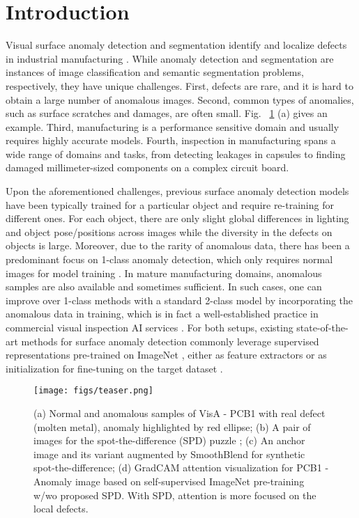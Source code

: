 \documentclass[runningheads]{llncs}
\begin{document}
\section{Introduction}
Visual surface anomaly detection and segmentation identify and localize defects in industrial manufacturing \cite{bergmann2021mvtec}. While anomaly detection and segmentation are instances of image classification and semantic segmentation problems, respectively, they have unique challenges. First, defects are rare, and it is hard to obtain a large number of anomalous images. Second, common types of anomalies, such as surface scratches and damages, are often small. Fig. ~\ref{fig:teaser} (a) gives an example. Third, manufacturing is a performance sensitive domain and usually requires highly accurate models. Fourth, inspection in manufacturing spans a wide range of domains and tasks, from detecting leakages in capsules to finding damaged millimeter-sized components on a complex circuit board. 

Upon the aforementioned challenges, previous surface anomaly detection models have been typically trained for a particular object and require re-training for different ones. For each object, there are only slight global differences in lighting and object pose/positions across images while the diversity in the defects on objects is large. 
Moreover, due to the rarity of anomalous data, there has been a predominant focus on 1-class anomaly detection, which only requires normal images for model training \cite{caron2020unsupervised,cohen2020sub,defard2021padim,li2021cutpaste,Roth_2022_CVPR,yi2020patch}. In mature manufacturing domains, anomalous samples are also available and sometimes sufficient. In such cases, one can improve over 1-class methods with a standard 2-class 
model \cite{cui2019class,feng2021few,gornitz2013toward,lin2017focal} by incorporating the anomalous data in training, which is in fact a well-established practice in commercial visual inspection AI services \cite{LfV,VIAI}.
For both setups, existing state-of-the-art methods for surface anomaly detection commonly leverage supervised representations pre-trained on ImageNet \cite{deng2009imagenet}, 
either as feature extractors \cite{defard2021padim,Roth_2022_CVPR} or as initialization for fine-tuning on the target dataset \cite{li2021cutpaste,yi2020patch}.

\begin{figure}[!t]
  \centering
  \texttt{[image: figs/teaser.png]}
  \caption{(a) Normal and anomalous samples of VisA - PCB1 with real defect (molten metal), anomaly highlighted by red ellipse; (b) A pair of images for the spot-the-difference (SPD) puzzle \cite{jhamtani2018learning}; (c) An anchor image and its variant augmented by SmoothBlend for synthetic spot-the-difference; (d) GradCAM attention visualization for PCB1 - Anomaly image based on self-supervised ImageNet pre-training w/wo proposed SPD. With SPD, attention is more focused on the local defects.}
  \label{fig:teaser}
\end{figure}
\end{document}
